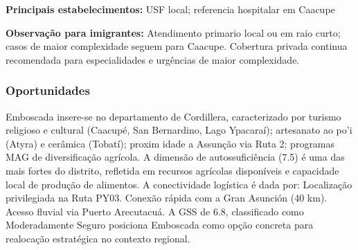 \textbf{Principais estabelecimentos:} USF local; referencia hospitalar
em Caacupe

\textbf{Observação para imigrantes:} Atendimento primario local ou em
raio curto; casos de maior complexidade seguem para Caacupe. Cobertura
privada continua recomendada para especialidades e urgências de maior
complexidade.
\newpage

\subsubsection*{Oportunidades}\label{oport-emboscada-0306}
Emboscada insere-se no departamento de Cordillera, caracterizado por turismo religioso e cultural (Caacupé, San Bernardino, Lago Ypacaraí); artesanato ao po'i (Atyra) e cerâmica (Tobatí); proxim idade a Assunção via Ruta 2; programas MAG de diversificação agrícola. A dimensão de autossuficiência (7.5) é uma das mais fortes do distrito, refletida em recursos agrícolas disponíveis e capacidade local de produção de alimentos. A conectividade logística é dada por: Localização privilegiada na Ruta PY03. Conexão rápida com a Gran Asunción (40 km). Acesso fluvial via Puerto Arecutacuá. A GSS de 6.8, classificado como Moderadamente Seguro posiciona Emboscada como opção concreta para realocação estratégica no contexto regional.

